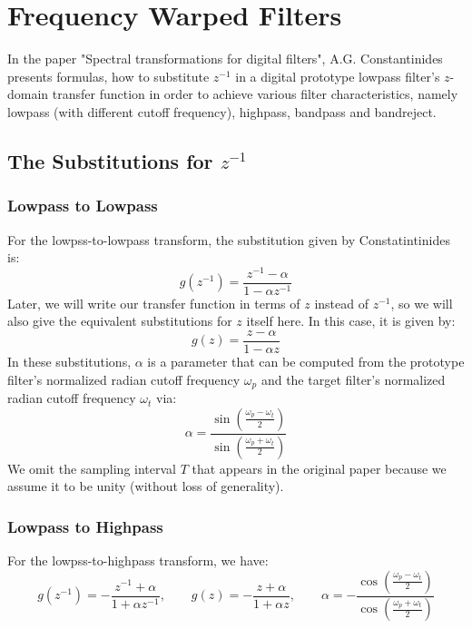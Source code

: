 \section{Frequency Warped Filters}

In the paper "Spectral transformations for digital filters", A.G. Constantinides presents formulas, how to substitute $z^{-1}$ in a digital prototype lowpass filter's $z$-domain transfer function in order to achieve various filter characteristics, namely lowpass (with different cutoff frequency), highpass, bandpass and bandreject. 


\subsection{The Substitutions for $z^{-1}$}

\subsubsection{Lowpass to Lowpass}
For the lowpss-to-lowpass transform, the substitution given by Constatintinides is:
\begin{equation}
g(z^{-1}) = \frac{z^{-1} - \alpha}{1 - \alpha z^{-1}}
\end{equation}
Later, we will write our transfer function in terms of $z$ instead of $z^{-1}$, so we will also give the equivalent substitutions for $z$ itself here. In this case, it is given by:
\begin{equation}
g(z) = \frac{z - \alpha}{1 - \alpha z}
\end{equation}
In these substitutions, $\alpha$ is a parameter that can be computed from the prototype filter's normalized radian cutoff frequency $\omega_p$ and the target filter's normalized radian cutoff frequency $\omega_t$ via:
\begin{equation}
\alpha = \frac{\sin( \frac{\omega_p-\omega_t}{2})}{\sin( \frac{\omega_p+\omega_t}{2})}
\end{equation}
We omit the sampling interval $T$ that appears in the original paper because we assume it to be unity (without loss of generality).

\subsubsection{Lowpass to Highpass}
For the lowpss-to-highpass transform, we have:
\begin{equation}
g(z^{-1}) = - \frac{z^{-1} + \alpha}{1 + \alpha z^{-1}}, \qquad
g(z)      = - \frac{z + \alpha}{1 + \alpha z},           \qquad
\alpha    = - \frac{\cos(\frac{\omega_p-\omega_t}{2})}{\cos(\frac{\omega_p+\omega_t}{2})}
\end{equation}

